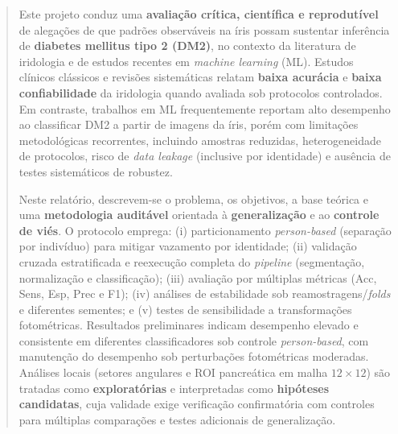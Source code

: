\documentclass[12pt,a4paper]{article}
\begin{document}
\begin{abstract}
Este projeto conduz uma \textbf{avaliação crítica, científica e reprodutível} de alegações de que padrões observáveis na íris possam sustentar inferência de \textbf{diabetes mellitus tipo 2 (DM2)}, no contexto da literatura de iridologia e de estudos recentes em \textit{machine learning} (ML). Estudos clínicos clássicos e revisões sistemáticas relatam \textbf{baixa acurácia} e \textbf{baixa confiabilidade} da iridologia quando avaliada sob protocolos controlados. Em contraste, trabalhos em ML frequentemente reportam alto desempenho ao classificar DM2 a partir de imagens da íris, porém com limitações metodológicas recorrentes, incluindo amostras reduzidas, heterogeneidade de protocolos, risco de \textit{data leakage} (inclusive por identidade) e ausência de testes sistemáticos de robustez.

Neste relatório, descrevem-se o problema, os objetivos, a base teórica e uma \textbf{metodologia auditável} orientada à \textbf{generalização} e ao \textbf{controle de viés}. O protocolo emprega: (i) particionamento \textit{person-based} (separação por indivíduo) para mitigar vazamento por identidade; (ii) validação cruzada estratificada e reexecução completa do \textit{pipeline} (segmentação, normalização e classificação); (iii) avaliação por múltiplas métricas (Acc, Sens, Esp, Prec e F1); (iv) análises de estabilidade sob reamostragens/\textit{folds} e diferentes sementes; e (v) testes de sensibilidade a transformações fotométricas. Resultados preliminares indicam desempenho elevado e consistente em diferentes classificadores sob controle \textit{person-based}, com manutenção do desempenho sob perturbações fotométricas moderadas. Análises locais (setores angulares e ROI pancreática em malha \(12\times 12\)) são tratadas como \textbf{exploratórias} e interpretadas como \textbf{hipóteses candidatas}, cuja validade exige verificação confirmatória com controles para múltiplas comparações e testes adicionais de generalização.
\end{abstract}


\tableofcontents
\newpage

\hypersetup{pageanchor=true}
\setcounter{page}{1}

\doublespacing

\end{document}
